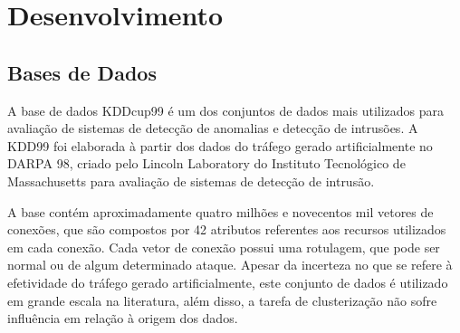 \chapter{Desenvolvimento}

  \section{Bases de Dados}

\indent A base de dados KDDcup99 \cite{kdd99} é um dos conjuntos de dados mais utilizados para avaliação de sistemas de detecção de anomalias e detecção de intrusões. A KDD99 foi elaborada à partir dos dados do tráfego gerado artificialmente no DARPA 98, criado pelo Lincoln Laboratory do Instituto Tecnológico de Massachusetts para avaliação de sistemas de detecção de intrusão.

\indent A base contém aproximadamente quatro milhões e novecentos mil vetores de conexões, que são compostos por 42 atributos referentes aos recursos utilizados em cada conexão. Cada vetor de conexão possui uma rotulagem, que pode ser normal ou de algum determinado ataque. Apesar da incerteza no que se refere à efetividade do tráfego gerado artificialmente, este conjunto de dados é utilizado em grande escala na literatura, além disso, a tarefa de clusterização não sofre influência em relação à origem dos dados.

